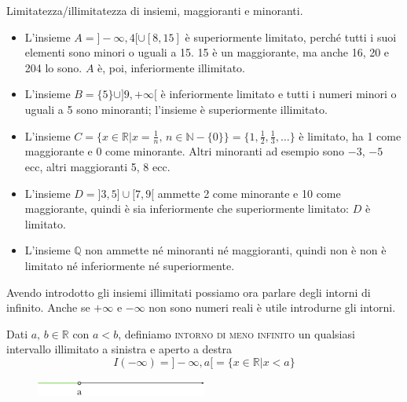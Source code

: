 \begin{esempio} Limitatezza/illimitatezza di insiemi, maggioranti e minoranti.
\begin{itemize}
  \item[a)] L'insieme \(A=]-\infty,4[ \cup [8,15]\) è superiormente 
limitato, perché tutti i suoi elementi sono minori o uguali a 15. 15 è un 
maggiorante, ma anche 16, 20 e 204 lo sono. \(A\) è, poi, inferiormente 
illimitato.\\
  \item[b)] L'insieme \(B=\{5\}\cup]9,+\infty[\) è inferiormente limitato 
e tutti i numeri minori o uguali a 5 sono minoranti; l'insieme è 
superiormente illimitato.\\

  \item[c)] L'insieme \(C=\{x\in\mathbb{R}\vert 
x=\frac{1}{n},\,n\in\mathbb{N}-\{0\}\}=\{1,\frac{1}{2},\frac{1}{3}
,\dots\}\) è limitato, ha 1 come maggiorante e 0 come minorante. Altri 
minoranti ad esempio sono \(-3\), \(-5\) ecc, altri maggioranti 5, 8 ecc.\\

  \item[d)] L'insieme \(D=]3,5]\cup[7,9[\) ammette 2 come minorante e 10 
come maggiorante, quindi è sia inferiormente che superiormente limitato: \(D\) 
è limitato.\\

  \item[e)] L'insieme \(\mathbb{Q}\) non ammette né minoranti né 
maggioranti, quindi non è non è limitato né inferiormente né superiormente.\\
\end{itemize}
\end{esempio}

Avendo introdotto gli insiemi illimitati possiamo ora parlare degli intorni 
di infinito. Anche se \(+\infty\) e \(-\infty\) non sono numeri reali è utile 
introdurne gli intorni.\\

\begin{definizione}
  Dati \(a,\,b\in\mathbb{R}\) con \(a<b\), definiamo \textsc{intorno di 
meno infinito} un qualsiasi intervallo illimitato a sinistra e aperto a destra
\begin{equation}
  I(-\infty)=]-\infty,a[=\{x\in\mathbb{R}\vert x<a\}
\end{equation}
\end{definizione}

\begin{figure}[htpb!]
  \centering
  \includegraphics[width=0.5\textwidth]{img/top_4.png}%
\end{figure}


